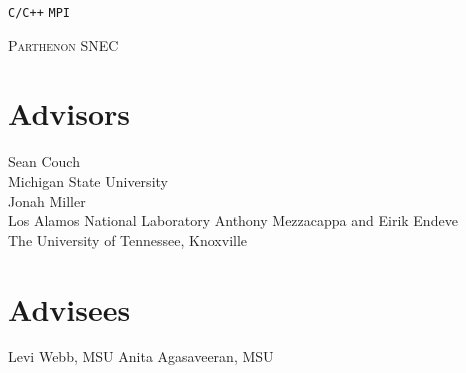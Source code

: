 \documentclass[letterpaper]{deedy-resume} %
\begin{document}
\begin{minipage}[t]{0.36\textwidth}

\texttt{C/C++} \textbullet{} \FORTRAN \textbullet{} \Python \textbullet{} \Julia \textbullet{} \Kokkos \textbullet{} \texttt{MPI}

\sectionspace %


\phoebus \textbullet{} \textsc{Parthenon} \textbullet{} \FLASH \textbullet{} \thornado \textbullet{} \textsc{SNEC} 
\sectionspace %


\section{Advisors}
Sean Couch \\
Michigan State University \\
Jonah Miller \\
Los Alamos National Laboratory
Anthony Mezzacappa and Eirik Endeve\\
The University of Tennessee, Knoxville

\section{Advisees}
Levi Webb, MSU
Anita Agasaveeran, MSU

\sectionspace %


\end{minipage} %
\hfill
%
%
\end{document}
